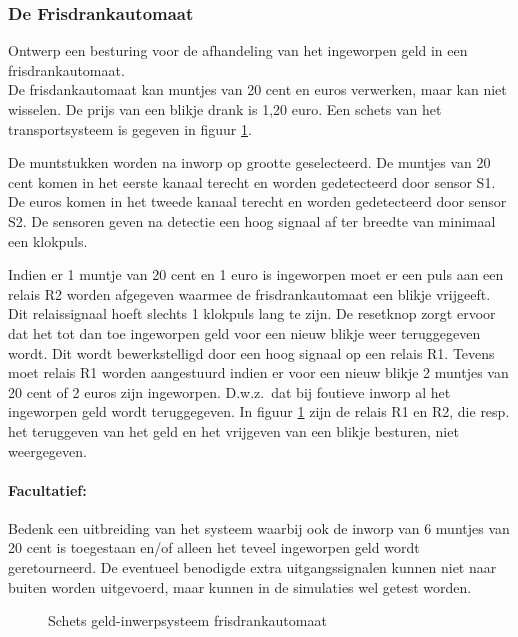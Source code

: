 \clearpage

\subsubsection{De Frisdrankautomaat}

Ontwerp een besturing voor de afhandeling van het ingeworpen geld in
een frisdrankautomaat.\\ 
De frisdankautomaat kan muntjes van 20 cent en euros verwerken, maar kan niet wisselen.
De prijs van een blikje drank is 1,20 euro.
Een schets van het transportsysteem is gegeven in figuur \ref{geldbox}.

De muntstukken worden na inworp op grootte geselecteerd. De muntjes van 20 cent komen in
het eerste kanaal terecht en worden gedetecteerd door sensor S1. De euros
komen in het tweede kanaal terecht en worden gedetecteerd door sensor S2. 
De sensoren geven na detectie een hoog signaal af ter breedte van minimaal een klokpuls.

Indien er 1 muntje van 20 cent en 1 euro is ingeworpen moet er een 
puls aan een relais R2 worden afgegeven waarmee de frisdrankautomaat 
een blikje vrijgeeft. Dit relaissignaal hoeft slechts 1 klokpuls lang te zijn.
De resetknop zorgt ervoor dat het tot dan toe ingeworpen geld voor een nieuw
blikje weer teruggegeven wordt. Dit wordt bewerkstelligd door een hoog signaal
op een relais R1. Tevens moet relais R1 worden aangestuurd indien er voor een
nieuw blikje 2 muntjes van 20 cent of 2 euros zijn ingeworpen.
D.w.z.\ dat bij foutieve inworp al het ingeworpen geld wordt teruggegeven.
In figuur \ref{geldbox} zijn de relais R1 en R2, die resp. het teruggeven van het geld en het vrijgeven van een blikje besturen, niet weergegeven.\\

\paragraph{Facultatief:} Bedenk een uitbreiding van het systeem waarbij ook
de inworp van 6 muntjes van 20 cent is toegestaan en/of alleen het teveel ingeworpen geld
wordt geretourneerd. De eventueel benodigde extra uitgangssignalen kunnen niet 
naar buiten worden uitgevoerd, maar kunnen in de simulaties wel getest worden.
\begin{figure}[hbt]
\centerline{}
\caption{Schets geld-inwerpsysteem frisdrankautomaat}
\label{geldbox}
\end{figure}

